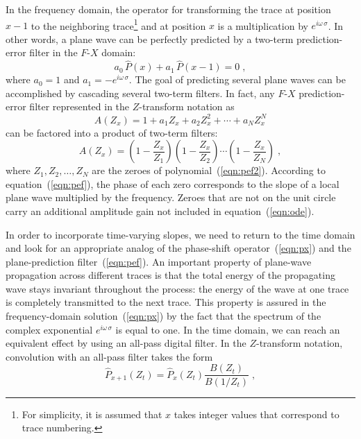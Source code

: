 In the frequency domain, the operator for transforming the trace at
position $x-1$ to the neighboring trace\footnote{For simplicity, it is
  assumed that $x$ takes integer values that correspond to trace
  numbering.} and at position $x$ is a multiplication by $e^{i
  \omega\,\sigma}$. In other words, a plane wave can be perfectly
predicted by a two-term prediction-error filter in the $F$-$X$ domain:
\begin{equation}
  a_0 \, \hat{P} (x) + a_1\, \hat{P} (x-1) = 0\;,
  \label{eqn:pef}
\end{equation}
where $a_0 = 1$ and $a_1 = - e^{i \omega\,\sigma}$. The goal of
predicting several plane waves can be accomplished by cascading
several two-term filters. In fact, any $F$-$X$ prediction-error
filter represented in the $Z$-transform notation as
\begin{equation}
  A(Z_x) = 1 + a_1 Z_x + a_2 Z_x^2 + \cdots + a_N Z_x^N
  \label{eqn:pef2}
\end{equation}
can be factored into a product of two-term filters:
\begin{equation}
  A(Z_x) = \left(1 - \frac{Z_x}{Z_1}\right)\left(1 - \frac{Z_x}{Z_2}\right)
  \cdots\left(1 - \frac{Z_x}{Z_N}\right)\;,
  \label{eqn:pef3}
\end{equation}
where $Z_1,Z_2,\ldots,Z_N$ are the zeroes of
polynomial~(\ref{eqn:pef2}). According to equation~(\ref{eqn:pef}),
the phase of each zero corresponds to the slope of a local plane wave
multiplied by the frequency. Zeroes that are not on the unit circle
carry an additional amplitude gain not included in
equation~(\ref{eqn:ode}).
\par
In order to incorporate time-varying slopes, we need to return to
the time domain and look for an appropriate analog of the phase-shift
operator~(\ref{eqn:px}) and the plane-prediction
filter~(\ref{eqn:pef}). An important property of plane-wave
propagation across different traces is that the total energy of the
propagating wave stays invariant throughout the process: the energy of 
the wave at one trace is completely transmitted to the next trace.
 This property
is assured in the frequency-domain solution~(\ref{eqn:px}) by the fact
that the spectrum of the complex exponential $e^{i \omega\,\sigma}$ is
equal to one.  In the time domain, we can reach an equivalent effect
by using an all-pass digital filter. In the $Z$-transform notation,
convolution with an all-pass filter takes the form
\begin{equation}
\hat{P}_{x+1}(Z_t) = \hat{P}_{x} (Z_t) \frac{B(Z_t)}{B(1/Z_t)}\;,
\label{eqn:allpass}
\end{equation}
